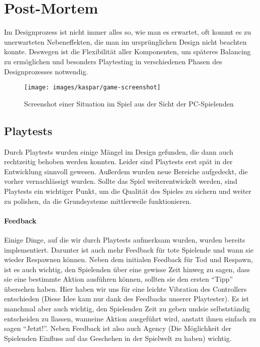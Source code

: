 \chapter{Post-Mortem}

Im Designprozess ist nicht immer alles so, wie man es erwartet, oft kommt es zu unerwarteten Nebeneffekten, die man im ursprünglichen Design nicht beachten konnte. Deswegen ist die Flexibilität aller Komponenten, um späteres Balancing zu ermöglichen und besonders Playtesting in verschiedenen Phasen des Designprozesses notwendig.

\begin{figure}[H]
	\centering
	\texttt{[image: images/kaspar/game-screenshot]}
	\caption{Screenshot einer Situation im Spiel aus der Sicht der PC-Spielenden}
\end{figure}

\section{Playtests}

Durch Playtests wurden einige Mängel im Design gefunden, die dann auch rechtzeitig behoben werden konnten. Leider sind Playtests erst spät in der Entwicklung sinnvoll gewesen. Außerdem wurden neue Bereiche aufgedeckt, die vorher vernachlässigt wurden. Sollte das Spiel weiterentwickelt werden, sind Playtests ein wichtiger Punkt, um die Qualität des Spieles zu sichern und weiter zu polishen, da die Grundsysteme mittlerweile funktionieren.

\subsubsection{Feedback}

Einige Dinge, auf die wir durch Playtests aufmerksam wurden, wurden bereits implementiert. Darunter ist auch mehr Feedback für tote Spielende und wann sie wieder Respawnen können. Neben dem initialen Feedback für Tod und Respawn, ist es auch wichtig, den Spielenden über eine gewisse Zeit hinweg zu sagen, dass sie eine bestimmte Aktion ausführen können, sollten sie den ersten "`Tipp"' übersehen haben. Hier haben wir uns für eine leichte Vibration des Controllers entschieden (Diese Idee kam nur dank des Feedbacks unserer Playtester). Es ist manchmal aber auch wichtig, den Spielenden Zeit zu geben undsie selbstständig entscheiden zu llassen, wanneine Aktion ausgeführt wird, anstatt ihnen einfach zu sagen "`Jetzt!"'. Neben Feedback ist also auch Agency (Die Möglichkeit der Spielenden Einfluss auf das Geschehen in der Spielwelt zu haben\cite[S.98]{_game_design_workshop}) wichtig.

